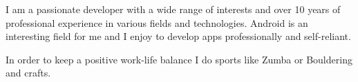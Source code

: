 

\begin{cvparagraph}

I am a passionate developer with a wide range of interests and over 10 years of professional experience in various fields and technologies. Android is an interesting field for me and I enjoy to develop apps professionally and self-reliant. 

In order to keep a positive work-life balance I do sports like Zumba or Bouldering and crafts.
\end{cvparagraph}
